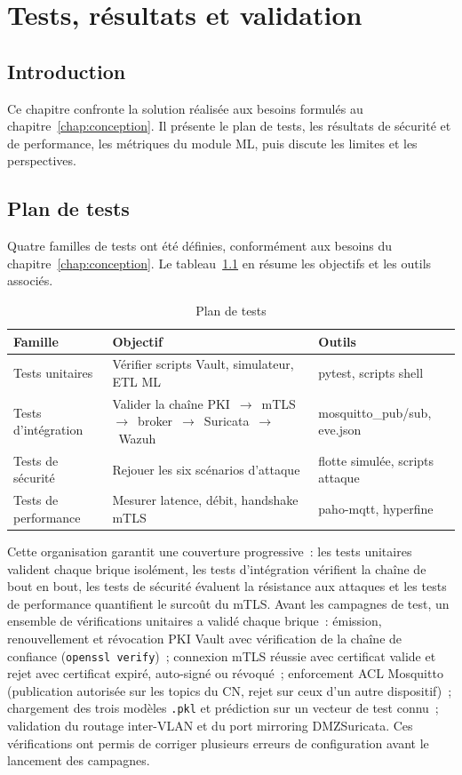 \chapter{Tests, résultats et validation}
\label{chap:tests-conclusion}

\section{Introduction}
\label{sec:tc-intro}

Ce chapitre confronte la solution réalisée aux besoins formulés au chapitre~\ref{chap:conception}. Il présente le plan de tests, les résultats de sécurité et de performance, les métriques du module ML, puis discute les limites et les perspectives.

\section{Plan de tests}
\label{sec:tc-plan}

Quatre familles de tests ont été définies, conformément aux besoins du chapitre~\ref{chap:conception}. Le tableau~\ref{tab:plan-tests} en résume les objectifs et les outils associés.

\begin{table}[!htbp]
\centering
\caption{Plan de tests}
\label{tab:plan-tests}
\small
\begin{tabularx}{\linewidth}{|l|X|X|}
\hline
\textbf{Famille} & \textbf{Objectif} & \textbf{Outils} \\
\hline
Tests unitaires & Vérifier scripts Vault, simulateur, ETL ML & pytest, scripts shell \\ \hline
Tests d'intégration & Valider la chaîne PKI~$\to$~mTLS~$\to$~broker~$\to$~Suricata~$\to$~Wazuh & mosquitto\_pub/sub, eve.json \\ \hline
Tests de sécurité & Rejouer les six scénarios d'attaque & flotte simulée, scripts attaque \\ \hline
Tests de performance & Mesurer latence, débit, handshake mTLS & paho-mqtt, hyperfine \\ \hline
\end{tabularx}
\end{table}

Cette organisation garantit une couverture progressive~: les tests unitaires valident chaque brique isolément, les tests d'intégration vérifient la chaîne de bout en bout, les tests de sécurité évaluent la résistance aux attaques et les tests de performance quantifient le surcoût du mTLS. Avant les campagnes de test, un ensemble de vérifications unitaires a validé chaque brique~: émission, renouvellement et révocation PKI Vault avec vérification de la chaîne de confiance (\texttt{openssl verify})~; connexion mTLS réussie avec certificat valide et rejet avec certificat expiré, auto-signé ou révoqué~; enforcement ACL Mosquitto (publication autorisée sur les topics du CN, rejet sur ceux d'un autre dispositif)~; chargement des trois modèles \texttt{.pkl} et prédiction sur un vecteur de test connu~; validation du routage inter-VLAN et du port mirroring DMZ\textrightarrow{}Suricata. Ces vérifications ont permis de corriger plusieurs erreurs de configuration avant le lancement des campagnes.

